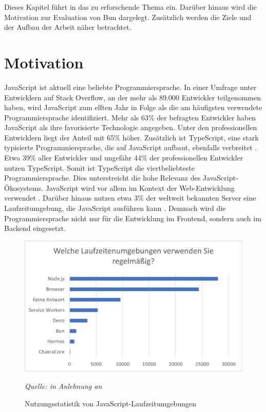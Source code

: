 \pagestyle{fancy-style}
 \label{ch:introduction}
Dieses Kapitel führt in das zu erforschende Thema ein. Darüber hinaus wird die Motivation zur Evaluation von Bun dargelegt. Zusätzlich werden die Ziele und der Aufbau der Arbeit näher betrachtet.

\section{Motivation} \label{sec:introduction-motivation}
JavaScript ist aktuell eine beliebte Programmiersprache. In einer Umfrage unter Entwicklern auf Stack Overflow, an der mehr als 89.000 Entwickler teilgenommen haben, wird JavaScript zum elften Jahr in Folge als die am häufigsten verwendete Programmiersprache identifiziert. Mehr als 63\% der befragten Entwickler haben JavaScript als ihre favorisierte Technologie angegeben. Unter den professionellen Entwicklern liegt der Anteil mit 65\% höher. Zusätzlich ist TypeScript, eine stark typisierte Programmiersprache, die auf JavaScript aufbaut, ebenfalls verbreitet \cite{Microsoft.o.J.}. Etwa 39\% aller Entwickler und ungefähr 44\% der professionellen Entwickler nutzen TypeScript. Somit ist TypeScript die viertbeliebteste Programmiersprache. Dies unterstreicht die hohe Relevanz des JavaScript-Ökosystems.\cite{StackOverflow.2023}\newline
JavaScript wird vor allem im Kontext der Web-Entwicklung verwendet \cite{Brown.2020}. Darüber hinaus nutzen etwa 3\% der weltweit bekannten Server eine Laufzeitumgebung, die JavaScript ausführen kann \cite{QSuccess.2023}. Demnach wird die Programmiersprache nicht nur für die Entwicklung im Frontend, sondern auch im Backend eingesetzt.\\

\begin{figure}[h]
	\centering
	\includegraphics[width=\linewidth]{./images/WhichRuntimesDoYouUseRegularly}
	\caption{Nutzungsstatistik von JavaScript-Laufzeitumgebungen}
	\label{fig:runtime-share}
	\textit{Quelle: in Anlehnung an \cite{Greif.2022}}
\end{figure}

